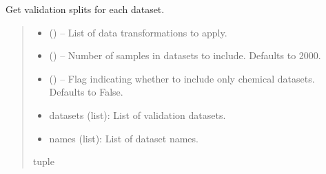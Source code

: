 \documentclass[letterpaper,10pt,english]{sphinxhowto}
\begin{document}

\begin{fulllineitems}
\label{\detokenize{datasets:datasets.get_val_datasets}}
\pysigstartsignatures
{}
\pysigstopsignatures
\sphinxAtStartPar
Get validation splits for each dataset.
\begin{quote}\begin{description}
\begin{itemize}
\item {} 
\sphinxAtStartPar
{} () – List of data transformations to apply.

\item {} 
\sphinxAtStartPar
{} (\sphinxstyleliteralemphasis{\sphinxupquote{, }}) – Number of samples in datasets to include. Defaults to 2000.

\item {} 
\sphinxAtStartPar
{} (\sphinxstyleliteralemphasis{\sphinxupquote{, }}) – Flag indicating whether to include only chemical datasets. Defaults to False.

\end{itemize}

\sphinxAtStartPar
\begin{description}
\begin{itemize}
\item {} 
\sphinxAtStartPar
datasets (list): List of validation datasets.

\item {} 
\sphinxAtStartPar
names (list): List of dataset names.

\end{itemize}

\end{description}


\sphinxAtStartPar
tuple

\end{description}\end{quote}

\end{fulllineitems}
\end{document}
